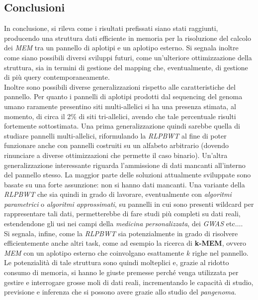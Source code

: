 \documentclass[a4paper,11pt, oneside,italian]{article}
\begin{document}
\subsection*{Conclusioni}
In conclusione, si rileva come i risultati prefissati siano stati raggiunti,
producendo una struttura dati efficiente in memoria per la risoluzione del
calcolo dei \textit{MEM} tra un pannello di aplotipi e un aplotipo
esterno.  
Si segnala inoltre come siano possibili diversi sviluppi futuri, come
un'ulteriore ottimizzazione della struttura, sia in termini 
di gestione del mapping che, eventualmente, di gestione di più query
contemporaneamente. \\
Inoltre sono possibili diverse generalizzazioni rispetto alle caratteristiche
del pannello. Per quanto i pannelli di aplotipi prodotti dal sequencing del
genoma umano raramente presentino siti multi-allelici si ha una 
presenza stimata, al momento, di circa il 2\% di siti tri-allelici, avendo che
tale percentuale risulti fortemente sottostimata. Una prima generalizzazione
quindi sarebbe quella di studiare pannelli multi-allelici, riformulando la
\textit{RLPBWT} al fine di poter funzionare anche con pannelli costruiti su un
alfabeto arbitrario (dovendo rinunciare a diverse ottimizzazioni che permette il
caso binario). Un'altra generalizzazione interessante riguarda l'ammissione di
dati mancanti all'interno del pannello stesso. La maggior parte delle soluzioni
attualmente sviluppate sono basate su una forte assunzione: non si hanno dati
mancanti. Una variante della \textit{RLPBWT} che sia quindi in grado di
lavorare, eventualmente con \textit{algoritmi parametrici} o \textit{algoritmi
  approssimati}, 
su pannelli in cui sono presenti wildcard per rappresentare tali dati,
permetterebbe di fare studi più completi su dati reali, estendendone gli usi nei
campi della \textit{medicina personalizzata}, dei \textit{GWAS} etc$\ldots$.\\ 
Si segnala, infine, come la \textit{RLPBWT} sia potenzialmente in grado di
risolvere 
efficientemente anche altri task, come ad esempio la ricerca di \textbf{k-MEM},
ovvero \textit{MEM} con un aplotipo esterno che coinvolgano
esattamente $k$ righe nel pannello. \\
Le potenzialità di tale struttura sono quindi molteplici e, grazie al ridotto
consumo di memoria, si hanno le giuste premesse perché venga utilizzata per
gestire e interrogare grosse moli di dati reali, incrementando le capacità di
studio, previsione e inferenza che si possono avere grazie allo studio del
\textit{pangenoma}.
\end{document}
